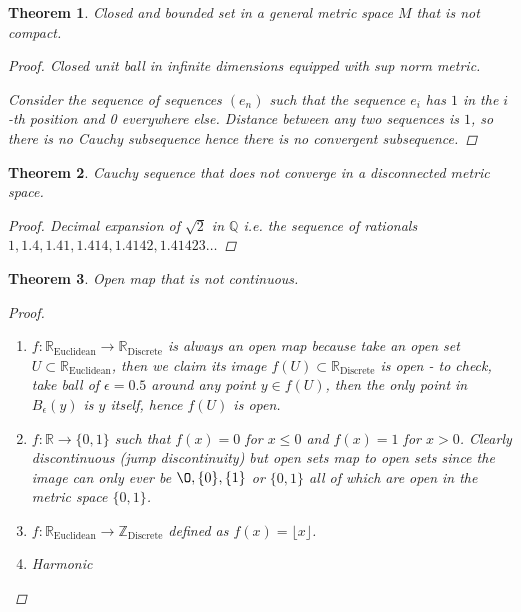 \documentclass[11pt]{article}
\newcommand{\bbQ}{\mathbb{Q}}
\newcommand{\bbR}{\mathbb{R}}
\newcommand{\bbZ}{\mathbb{Z}}
\renewcommand{\emptyset}{\O}
\renewcommand{\_}[1]{\underline{ #1 }}
\newtheorem{theorem}{Theorem}[section]
\theoremstyle{definition}
\numberwithin{equation}{subsection}
\begin{document}
\begin{theorem}
Closed and bounded set in a general metric space $M$ that is not compact.
\begin{proof}
Closed unit ball in infinite dimensions equipped with sup norm metric.

Consider the sequence of sequences $(e_n)$ such that the sequence $e_i$ has $1$ in the $i$-th position and 0 everywhere else. Distance between any two sequences is $1$, so there is no Cauchy subsequence hence there is no convergent subsequence.

\end{proof}
\end{theorem}

\begin{theorem}
    Cauchy sequence that does not converge in a disconnected metric space.
\begin{proof}
    Decimal expansion of $\sqrt2$ in $\bbQ$ i.e. the sequence of rationals $1, 1.4, 1.41, 1.414, 1.4142, 1.41423\dots$
\end{proof}
\end{theorem}


\begin{theorem}
Open map that is not continuous.
\begin{proof}
\begin{enumerate}
    \item $f: \bbR_{\text{Euclidean}} \to \bbR_{\text{Discrete}}$ is always an open map because take an open set $U \subset \bbR_{\text{Euclidean}}$, then we claim its image $f(U) \subset \bbR_{\text{Discrete}}$ is open - to check, take ball of $\epsilon = 0.5$ around any point $y\in f(U)$, then the only point in $B_\epsilon(y)$ is $y$ itself, hence $f(U)$ is open.

    \item $f: \bbR \to \{0,1\}$ such that $f(x)=0$ for $x\leq 0$ and $f(x)=1$ for $x>0$. Clearly discontinuous (jump discontinuity) but open sets map to open sets since the image can only ever be $\emptyset, \{0\}, \{1\}$ or $\{0,1\}$ all of which are open in the metric space $\{0,1\}$. 

    \item $f:\bbR_{\text{Euclidean}} \to \bbZ_{\text{Discrete}}$ defined as $f(x) = \lfloor x \rfloor$. 

    \item Harmonic
    
\end{enumerate}
\end{proof}
\end{theorem}
\end{document}
